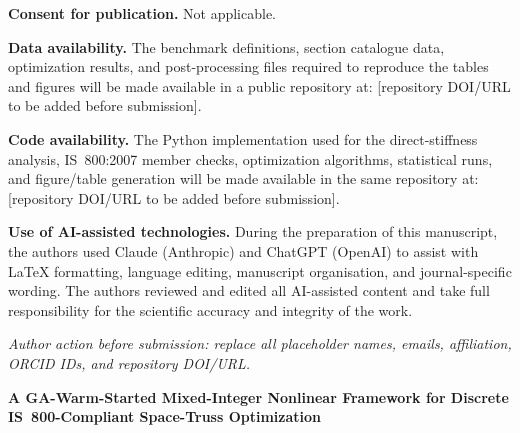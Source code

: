 \documentclass[lineno,pdflatex,sn-mathphys-num]{sn-jnl}
\begin{document}
\begin{titlepage}
\vspace{0.45em}
\noindent\textbf{Consent for publication.} Not applicable.

\vspace{0.45em}
\noindent\textbf{Data availability.} The benchmark definitions, section catalogue data, optimization results, and post-processing files required to reproduce the tables and figures will be made available in a public repository at: [repository DOI/URL to be added before submission].

\vspace{0.45em}
\noindent\textbf{Code availability.} The Python implementation used for the direct-stiffness analysis, IS~800:2007 member checks, optimization algorithms, statistical runs, and figure/table generation will be made available in the same repository at: [repository DOI/URL to be added before submission].

\vspace{0.45em}
\noindent\textbf{Use of AI-assisted technologies.} During the preparation of this manuscript, the authors used Claude (Anthropic) and ChatGPT (OpenAI) to assist with \LaTeX{} formatting, language editing, manuscript organisation, and journal-specific wording. The authors reviewed and edited all AI-assisted content and take full responsibility for the scientific accuracy and integrity of the work.

\vfill
\noindent\textit{Author action before submission: replace all placeholder names, emails, affiliation, ORCID IDs, and repository DOI/URL.}
\end{titlepage}
\clearpage
\setcounter{page}{1}

\begin{center}
{\LARGE\bfseries A GA-Warm-Started Mixed-Integer Nonlinear Framework for Discrete IS~800-Compliant Space-Truss Optimization}
\end{center}
\end{document}
